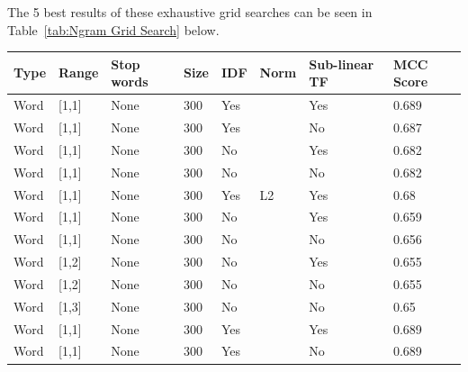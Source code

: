 The 5 best results of these exhaustive grid searches can be seen in Table~\ref{tab:Ngram Grid Search} below.

\begin{table}[h]
  \begin{center}
  \begin{tabular}{ l l l l l l l l }
    \toprule
    Type & Range & Stop words & Size & IDF & Norm & Sub-linear TF & MCC Score \\
    \midrule
    Word & [1,1] & None & 300 & Yes &  & Yes & 0.689 \\
    Word & [1,1] & None & 300 & Yes &  & No & 0.687 \\
    Word & [1,1] & None & 300 & No &  & Yes & 0.682 \\
    Word & [1,1] & None & 300 & No &  & No & 0.682 \\
    Word & [1,1] & None & 300 & Yes & L2 & Yes & 0.68 \\
    \midrule
    Word & [1,1] & None & 300 & No & & Yes & 0.659  \\
    Word & [1,1] & None & 300 & No & & No & 0.656 \\
    Word & [1,2] & None & 300 & No & & Yes & 0.655 \\
    Word & [1,2] & None & 300 & No & & No & 0.655 \\
    Word & [1,3] & None & 300 & No & & No & 0.65 \\
    \midrule
    Word & [1,1] & None & 300 & Yes & & Yes & 0.689 \\
    Word & [1,1] & None & 300 & Yes & & No  & 0.689 \\

\end{tabular}
\end{center}
\end{table}
